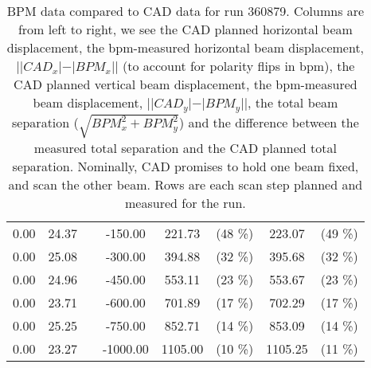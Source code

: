 \begin{table}
\begin{tabular}{c c c c c c c c}
0.00 & 24.37 &  & -150.00 & 221.73 &  (48 \%) & 223.07 &  (49 \%)\\
0.00 & 25.08 &  & -300.00 & 394.88 &  (32 \%) & 395.68 &  (32 \%)\\
0.00 & 24.96 &  & -450.00 & 553.11 &  (23 \%) & 553.67 &  (23 \%)\\
0.00 & 23.71 &  & -600.00 & 701.89 &  (17 \%) & 702.29 &  (17 \%)\\
0.00 & 25.25 &  & -750.00 & 852.71 &  (14 \%) & 853.09 &  (14 \%)\\
0.00 & 23.27 &  & -1000.00 & 1105.00 &  (10 \%) & 1105.25 &  (11 \%)\\
\bottomrule
\end{tabular}
\caption{ BPM data compared to CAD data for run 360879. Columns are from left to right, we see the CAD planned horizontal beam displacement, the bpm-measured horizontal beam displacement, $||CAD_{x}| - |BPM_{x}||$ (to account for polarity flips in bpm), the CAD planned vertical beam displacement, the bpm-measured beam displacement, $||CAD_{y}| - |BPM_{y}||$, the total beam separation ($\sqrt{BPM_{x}^2+BPM_{y}^2}$) and the difference between the measured total separation and the CAD planned total separation. Nominally, CAD promises to hold one beam fixed, and scan the other beam. Rows are each scan step planned and measured for the run. }
\end{table}

